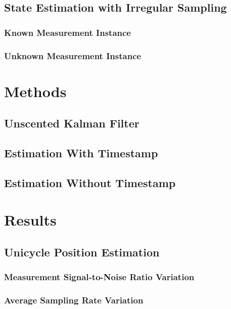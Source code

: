 \section{State Estimation with Irregular Sampling}

\subsection{Known Measurement Instance}

\subsection{Unknown Measurement Instance}

\chapter{Methods}

\section{Unscented Kalman Filter}

\section{Estimation With Timestamp}

\section{Estimation Without Timestamp}

\chapter{Results}

\section{Unicycle Position Estimation}

\subsection{Measurement Signal-to-Noise Ratio Variation}

\subsection{Average Sampling Rate Variation}

